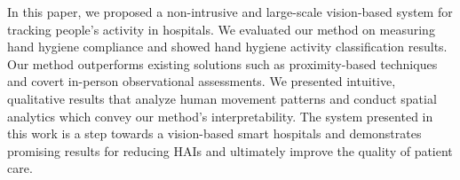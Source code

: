 \documentclass[twoside,11pt]{article}
\begin{document}
In this paper, we proposed a non-intrusive and large-scale vision-based system for tracking people's activity in hospitals.
We evaluated our method on measuring hand hygiene compliance and showed hand hygiene activity classification results.
Our method outperforms existing solutions such as proximity-based techniques and covert in-person observational assessments.
We presented intuitive, qualitative results that analyze human movement patterns and conduct spatial analytics which convey our method's interpretability.
The system presented in this work is a step towards a vision-based smart hospitals and demonstrates promising results for reducing HAIs and ultimately improve the quality of patient care.

\newpage
\clearpage

\end{document}
